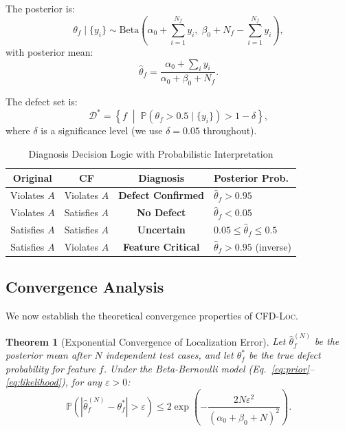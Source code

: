 \documentclass[journal]{IEEEtran}
\theoremstyle{plain}
\newtheorem{theorem}{Theorem}[section]
\theoremstyle{definition}
\theoremstyle{remark}
\newcommand{\methodname}{\textsc{CFD-Loc}}
\newcommand{\Prob}{\mathbb{P}}
\begin{document}
The posterior is:
\begin{equation}
\theta_f \mid \{y_i\} \sim \text{Beta}\left(\alpha_0 + \sum_{i=1}^{N_f} y_i,\; \beta_0 + N_f - \sum_{i=1}^{N_f} y_i\right),
\label{eq:posterior}
\end{equation}
with posterior mean:
\begin{equation}
\hat{\theta}_f = \frac{\alpha_0 + \sum_i y_i}{\alpha_0 + \beta_0 + N_f}.
\label{eq:posterior_mean}
\end{equation}

The defect set is:
\begin{equation}
\mathcal{D}^* = \left\{ f \;\middle|\; \Prob(\theta_f > 0.5 \mid \{y_i\}) > 1 - \delta \right\},
\label{eq:defect_set}
\end{equation}
where $\delta$ is a significance level (we use $\delta = 0.05$ throughout).

\begin{table}[t]
\centering
\caption{Diagnosis Decision Logic with Probabilistic Interpretation}
\label{tab:decision}
\small
\begin{tabular}{cccl}
\toprule
\textbf{Original} & \textbf{CF} & \textbf{Diagnosis} & \textbf{Posterior Prob.} \\\midrule
\cellcolor{red!10} Violates $A$ & \cellcolor{red!10} Violates $A$ & \cellcolor{red!10} \textbf{Defect Confirmed} & $\hat{\theta}_f > 0.95$ \\
\cellcolor{green!10} Violates $A$ & \cellcolor{green!10} Satisfies $A$ & \cellcolor{green!10} \textbf{No Defect} & $\hat{\theta}_f < 0.05$ \\
\cellcolor{yellow!10} Satisfies $A$ & \cellcolor{yellow!10} Satisfies $A$ & \cellcolor{yellow!10} \textbf{Uncertain} & $0.05 \leq \hat{\theta}_f \leq 0.5$ \\
\cellcolor{orange!10} Satisfies $A$ & \cellcolor{orange!10} Violates $A$ & \cellcolor{orange!10} \textbf{Feature Critical} & $\hat{\theta}_f > 0.95$ (inverse) \\
\bottomrule
\end{tabular}
\end{table}

\subsection{Convergence Analysis}

We now establish the theoretical convergence properties of \methodname.

\begin{theorem}[Exponential Convergence of Localization Error]\label{thm:convergence}
Let $\hat{\theta}_f^{(N)}$ be the posterior mean after $N$ independent test cases, and let $\theta_f^*$ be the true defect probability for feature $f$. Under the Beta-Bernoulli model (Eq.~\ref{eq:prior}--\ref{eq:likelihood}), for any $\varepsilon > 0$:
\begin{equation}
\Prob\left( |\hat{\theta}_f^{(N)} - \theta_f^*| > \varepsilon \right) \leq 2\exp\left(-\frac{2N\varepsilon^2}{(\alpha_0+\beta_0+N)^2}\right).
\label{eq:convergence}
\end{equation}
\end{theorem}
\end{document}
